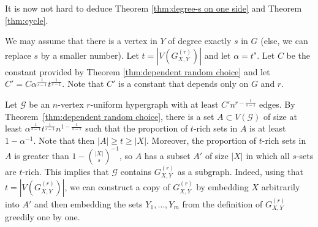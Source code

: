 \documentclass[a4paper,11pt]{article}
\makeatletter
\renewenvironment{proof}[1][\proofname] {\par\pushQED{\qed}\normalfont\topsep6\p@\@plus6\p@\relax\trivlist\item[\hskip\labelsep\bfseries#1\@addpunct{.}]\ignorespaces}{\popQED\endtrivlist\@endpefalse}
\theoremstyle{definition}
\def\cG{\mathcal{G}}
\makeatother
\begin{document}
It is now not hard to deduce Theorem \ref{thm:degree-s on one side} and Theorem \ref{thm:cycle}.

\begin{proof}[Proof of Theorem \ref{thm:degree-s on one side}]
We may assume that there is a vertex in $Y$ of degree exactly $s$ in $G$ (else, we can replace $s$ by a smaller number). Let $t=|V(G_{X,Y}^{(r)})|$ and let $\alpha=t^s$. Let $C$ be the constant provided by Theorem \ref{thm:dependent random choice} and let $C'=C\alpha^{\frac{1}{s-1}}t^{\frac{1}{s-1}}$. Note that $C'$ is a constant that depends only on $G$ and $r$.

Let $\cG$ be an $n$-vertex $r$-uniform hypergraph with at least $C'n^{r-\frac{1}{s-1}}$ edges. By Theorem~\ref{thm:dependent random choice}, there is a set $A\subset V(\cG)$ of size at least $\alpha^{\frac{1}{s-1}}t^{\frac{1}{s-1}}n^{1-\frac{1}{s-1}}$ such that the proportion of $t$-rich sets in $A$ is at least $1-\alpha^{-1}$. Note that then $|A|\geq t\geq |X|$. Moreover, the proportion of $t$-rich sets in $A$ is greater than $1-\binom{|X|}{s}^{-1}$, so $A$ has a subset $A'$ of size $|X|$ in which all $s$-sets are $t$-rich. This implies that $\cG$ contains $G_{X,Y}^{(r)}$ as a subgraph. 
Indeed, using that $t=|V(G_{X,Y}^{(r)})|$, we can construct a copy of $G_{X,Y}^{(r)}$ by embedding $X$ arbitrarily into $A'$ and then embedding the sets $Y_1,\dots,Y_m$ from the definition of $G_{X,Y}^{(r)}$ greedily one by one. 
\end{proof}
\end{document}
